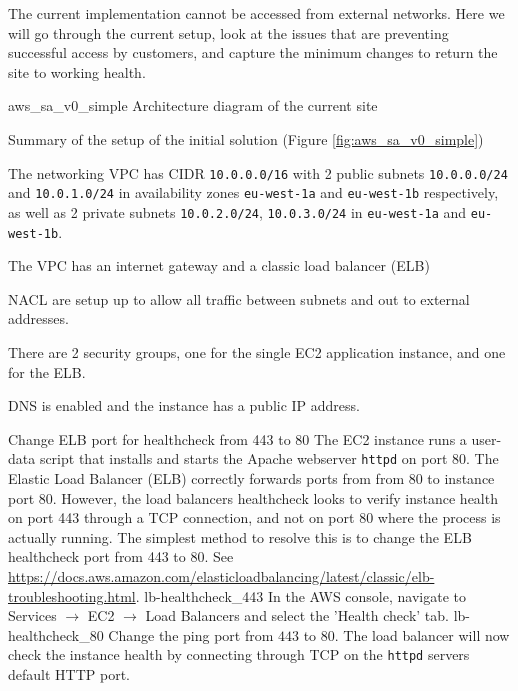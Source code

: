 

The current implementation cannot be accessed from external networks. Here we will go through the current setup, look at the issues that are preventing successful access by customers, and capture the minimum changes to return the site to working health.

\architecture
{aws_sa_v0_simple}
{Architecture diagram of the current site}
	\FloatBarrier
	
\changes
{Summary of the setup of the initial solution (Figure \ref{fig:aws_sa_v0_simple})}
{
	\item The networking VPC has CIDR  \texttt{10.0.0.0/16} with 2 public subnets \texttt{10.0.0.0/24} and \texttt{10.0.1.0/24} in availability zones \texttt{eu-west-1a} and \texttt{eu-west-1b} respectively, as well as 2 private subnets \texttt{10.0.2.0/24}, \texttt{10.0.3.0/24} in \texttt{eu-west-1a} and \texttt{eu-west-1b}. 

	\item The VPC has an internet gateway and a classic load balancer (ELB)
	
	\item NACL are setup up to allow all traffic between subnets and out to external addresses.
	
	\item There are 2 security groups, one for the single EC2 application instance, and one for the ELB.
	
	\item DNS is enabled and the instance has a public IP address.
}


{Change ELB port for healthcheck from 443 to 80}
{
	The EC2 instance runs a user-data script that installs and starts the Apache webserver \texttt{httpd} on port $80$. The Elastic Load Balancer (ELB) correctly forwards ports
	from from 80 to instance port $80$. However, the load balancers healthcheck looks to verify instance health on port 443 through a TCP connection, and not on port 80 where the process is actually running. The simplest method to resolve this is to change the ELB healthcheck port from 443 to 80. See 	\url{https://docs.aws.amazon.com/elasticloadbalancing/latest/classic/elb-troubleshooting.html}.
}
{
	\imagefigsinglebox
	{lb-healthcheck_443}
	{In the AWS console, navigate to Services  $\rightarrow$ EC2  $\rightarrow$ Load Balancers and select the 'Health check' tab.}
	\imagefigsinglebox
	{lb-healthcheck_80}
	{Change the ping port from $443$ to $80$. The load balancer will now check the instance health by connecting through TCP on the \texttt{httpd} servers default HTTP port.}
}
\FloatBarrier



